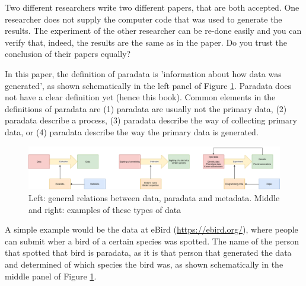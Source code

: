 
Two different researchers write two different papers,
that are both accepted. One researcher does not supply the
computer code that was used to generate the results.
The experiment of the other researcher can be re-done easily
and you can verify that, indeed, the results are the same
as in the paper.
Do you trust the conclusion of their papers equally?


In this paper, the definition of paradata
is 'information about how data was generated',
as shown schematically in the left panel of Figure \ref{fig:figure_1}.
Paradata does not have a clear definition yet (hence this book). 
Common elements in the definitions of paradata are 
(1) paradata are usually not the primary data, (2) paradata describe
a process, (3) paradata describe the way of collecting primary data, or 
(4) paradata describe the way the primary data is generated.

\begin{figure}[!htbp]
  \centering
  \includegraphics[width=\linewidth]{figure_1.png}
  \caption{
    Left: general relations between data, paradata and metadata.
    Middle and right: examples of these types of data
  }
  \label{fig:figure_1}
\end{figure}


A simple example would be the data at eBird (\url{https://ebird.org/}),
where people can submit wher a bird of a certain species was spotted.
The name of the person that spotted that bird is paradata, 
as it is that person that generated the data and determined of
which species the bird was, 
as shown schematically in the middle panel of Figure \ref{fig:figure_1}.

